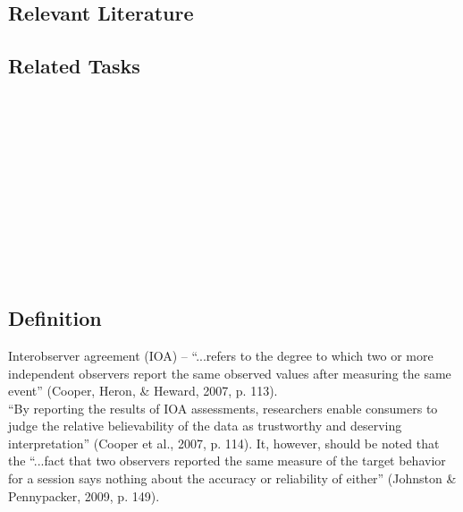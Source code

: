 \subsection{Relevant Literature}
\begin{refsection}
\nocite{cooper2007applied,johnston1993strategies}
\printbibliography[heading=none]
\end{refsection}
%
\subsection{Related Tasks}
\fouraOne{}\\
\fouraTwo{}\\
\fouraThree{}\\
\fouraFour{}\\
\fouraFive{}\\
\fouraSix{}\\
\fouraSeven{}\\
\fouraEight{}\\
\fourhOne{}\\
\fourhTwo{}\\
%
\clearpage \section{\fouraEight{}}
\subsection{Definition} 
Interobserver agreement (IOA) –  ``...refers to the degree to which two or more independent observers report the same observed values after measuring the same event'' (Cooper, Heron, \& Heward, 2007, p. 113).\\

``By reporting the results of IOA assessments, researchers enable consumers to judge the relative believability of the data as trustworthy and deserving interpretation'' (Cooper et al., 2007, p. 114). It, however, should be noted that the ``...fact that two observers reported the same measure of the target behavior for a session says nothing about the accuracy or reliability of either'' (Johnston \& Pennypacker, 2009, p. 149).

